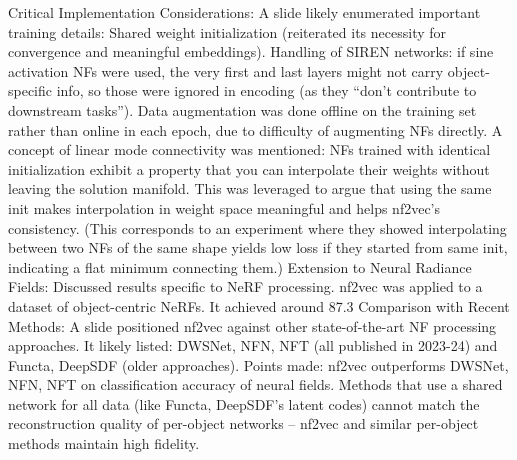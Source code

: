 \documentclass[11pt]{article}
\begin{document}
Critical Implementation Considerations: A slide likely enumerated important training details:
Shared weight initialization (reiterated its necessity for convergence and meaningful embeddings).
Handling of SIREN networks: if sine activation NFs were used, the very first and last layers might not carry object-specific info, so those were ignored in encoding (as they “don’t contribute to downstream tasks”).
Data augmentation was done offline on the training set rather than online in each epoch, due to difficulty of augmenting NFs directly.
A concept of linear mode connectivity was mentioned: NFs trained with identical initialization exhibit a property that you can interpolate their weights without leaving the solution manifold. This was leveraged to argue that using the same init makes interpolation in weight space meaningful and helps nf2vec’s consistency. (This corresponds to an experiment where they showed interpolating between two NFs of the same shape yields low loss if they started from same init, indicating a flat minimum connecting them.)
Extension to Neural Radiance Fields: Discussed results specific to NeRF processing. nf2vec was applied to a dataset of object-centric NeRFs. It achieved around 87.3%
Comparison with Recent Methods: A slide positioned nf2vec against other state-of-the-art NF processing approaches. It likely listed: DWSNet, NFN, NFT (all published in 2023-24) and Functa, DeepSDF (older approaches). Points made:
nf2vec outperforms DWSNet, NFN, NFT on classification accuracy of neural fields.
Methods that use a shared network for all data (like Functa, DeepSDF’s latent codes) cannot match the reconstruction quality of per-object networks – nf2vec and similar per-object methods maintain high fidelity.
\end{document}
